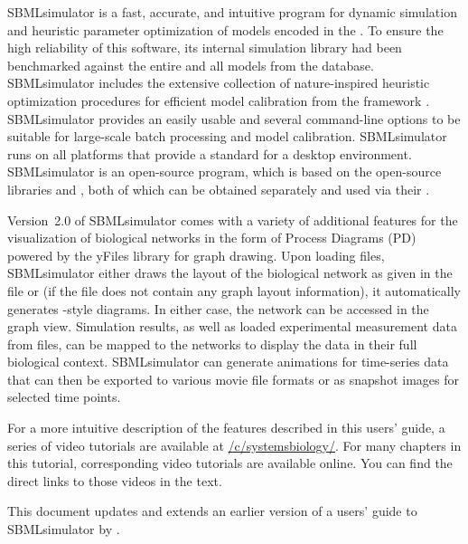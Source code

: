 SBMLsimulator is a fast, accurate, and intuitive program for dynamic simulation and heuristic parameter optimization of models encoded in the \SBML.
To ensure the high reliability of this software, its internal simulation library had been
benchmarked against the entire \SBMLTestSuite and all models from the \BioModels database.
SBMLsimulator includes the extensive collection of nature-inspired heuristic optimization procedures for efficient model calibration from the framework \EvA.
SBMLsimulator provides an easily usable \GUI and several command-line options to be suitable for large-scale batch processing and model calibration.
SBMLsimulator runs on all platforms that provide a standard \JVM for a desktop environment.
SBMLsimulator is an open-source program, which is based on the open-source libraries \JSBML and \SBSCL, both of which can be obtained separately and used via their \API.

Version~2.0 of SBMLsimulator comes with a variety of additional features for the visualization of biological networks in the form of \SBGN Process Diagrams (PD) powered by the yFiles library for graph drawing.
Upon loading \SBML files, SBMLsimulator either draws the layout of the biological network as given in the file or (if the \SBML file does not contain any graph layout information), it automatically generates \SBGN-style diagrams.
In either case, the network can be accessed in the graph view.
Simulation results, as well as loaded experimental measurement data from \CSV files, can be mapped to the networks to display the data in their full biological context.
SBMLsimulator can generate animations for time-series data that can then be exported to various movie file formats or as snapshot images for selected time points.

For a more intuitive description of the features described in this users' guide, a series of video tutorials are available at \href{https://youtube.com/c/systemsbiology/}{\faYoutube/c/systemsbiology/}.
For many chapters in this tutorial, corresponding video tutorials are available online.
You can find the direct links to those videos in the text.

This document updates and extends an earlier version of a users' guide to SBMLsimulator by \citet*{Doerr2014a}.
